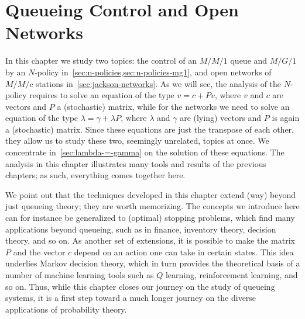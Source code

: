 







\chapter{Queueing Control and Open Networks}
\label{cha:queu-contr-open}

In this chapter we study two topics: the control of an $M/M/1$ queue and $M/G/1$ by an $N$-policy in~\cref{sec:n-policies,sec:n-policies-mg1}, and open networks of $M/M/c$ stations in~\cref{sec:jackson-networks}.
As we will see, the analysis of the $N$-policy requires to solve an equation of the type $v = c + P v$, where $v$ and $c$ are vectors and $P$ a (stochastic) matrix, while for the networks we need to solve an equation of the type $\lambda = \gamma + \lambda P$, where $\lambda$ and $\gamma$ are (lying) vectors and $P$ is again a (stochastic) matrix.
Since these equations are just the transpose of each other, they allow us to study these two, seemingly unrelated, topics at once.
We concentrate in~\cref{sec:lambda-=-gamma} on the solution of these equations.
The analysis in this chapter illustrates many tools and results of the previous chapters; as such, everything comes together here.

We point out that the techniques developed in this chapter extend (way) beyond just queueing theory; they are worth memorizing.
The concepts we introduce here can for instance be generalized to (optimal) stopping problems, which find many applications beyond queueing, such as in finance, inventory theory, decision theory, and so on.
As another set of extensions, it is possible to make the matrix $P$ and the vector $c$ depend on an action one can take in certain states.
This idea underlies Markov decision theory, which in turn provides the theoretical basis of a number of machine learning tools such as $Q$ learning, reinforcement learning, and so on.
Thus, while this chapter closes our journey on the study of queueing systems, it is a first step toward a much longer journey on the diverse applications of probability theory. 










